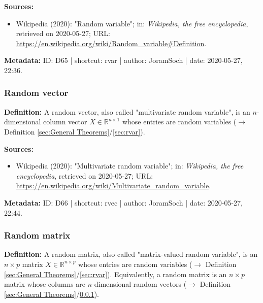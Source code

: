 \documentclass[a4paper,12pt,twoside]{book}
\begin{document}
\vspace{1em}
\textbf{Sources:}
\begin{itemize}
\item Wikipedia (2020): "Random variable"; in: \textit{Wikipedia, the free encyclopedia}, retrieved on 2020-05-27; URL: \url{https://en.wikipedia.org/wiki/Random_variable#Definition}.
\end{itemize}


\vspace{1em}
\textbf{Metadata:} ID: D65 | shortcut: rvar | author: JoramSoch | date: 2020-05-27, 22:36.
\vspace{1em}



\subsubsection[\textit{Random vector}]{Random vector} \label{sec:rvec}
\setcounter{equation}{0}

\textbf{Definition:} A random vector, also called "multivariate random variable", is an $n$-dimensional column vector $X \in \mathbb{R}^{n \times 1}$ whose entries are random variables ($\rightarrow$ Definition \ref{sec:General Theorems}/\ref{sec:rvar}).


\vspace{1em}
\textbf{Sources:}
\begin{itemize}
\item Wikipedia (2020): "Multivariate random variable"; in: \textit{Wikipedia, the free encyclopedia}, retrieved on 2020-05-27; URL: \url{https://en.wikipedia.org/wiki/Multivariate_random_variable}.
\end{itemize}


\vspace{1em}
\textbf{Metadata:} ID: D66 | shortcut: rvec | author: JoramSoch | date: 2020-05-27, 22:44.
\vspace{1em}



\subsubsection[\textit{Random matrix}]{Random matrix} \label{sec:rmat}
\setcounter{equation}{0}

\textbf{Definition:} A random matrix, also called "matrix-valued random variable", is an $n \times p$ matrix $X \in \mathbb{R}^{n \times p}$ whose entries are random variables ($\rightarrow$ Definition \ref{sec:General Theorems}/\ref{sec:rvar}). Equivalently, a random matrix is an $n \times p$ matrix whose columns are $n$-dimensional random vectors ($\rightarrow$ Definition \ref{sec:General Theorems}/\ref{sec:rvec}).
\end{document}
